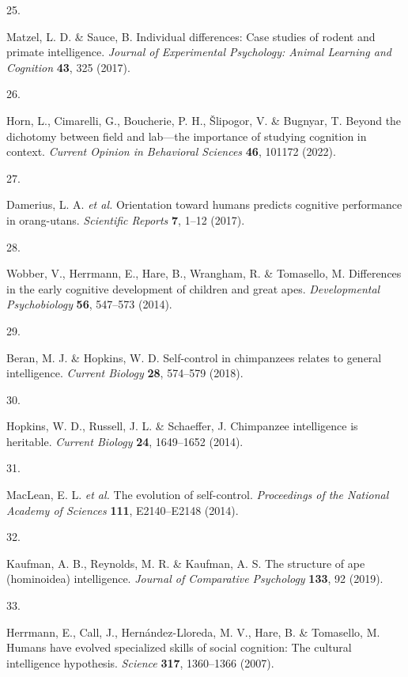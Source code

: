 \documentclass[
  man,floatsintext]{apa6}
\newlength{\cslhangindent}
\newlength{\csllabelwidth}
\newlength{\cslentryspacingunit} %
\newenvironment{CSLReferences}[2] %
 {%
  \setlength{\parindent}{0pt}
  \ifodd #1
  \let\oldpar\par
  \def\par{\hangindent=\cslhangindent\oldpar}
  \fi
  \setlength{\parskip}{#2\cslentryspacingunit}
 }%
 {}
\newcommand{\CSLLeftMargin}[1]{\parbox[t]{\csllabelwidth}{#1}}
\newcommand{\CSLRightInline}[1]{\parbox[t]{\linewidth - \csllabelwidth}{#1}\break}
\begin{document}
\begin{CSLReferences}{0}{0}
\leavevmode{}%
\CSLLeftMargin{25. }%
\CSLRightInline{Matzel, L. D. \& Sauce, B. Individual differences: Case studies of rodent and primate intelligence. \emph{Journal of Experimental Psychology: Animal Learning and Cognition} \textbf{43}, 325 (2017).}

\leavevmode{}%
\CSLLeftMargin{26. }%
\CSLRightInline{Horn, L., Cimarelli, G., Boucherie, P. H., Šlipogor, V. \& Bugnyar, T. Beyond the dichotomy between field and lab---the importance of studying cognition in context. \emph{Current Opinion in Behavioral Sciences} \textbf{46}, 101172 (2022).}

\leavevmode{}%
\CSLLeftMargin{27. }%
\CSLRightInline{Damerius, L. A. \emph{et al.} Orientation toward humans predicts cognitive performance in orang-utans. \emph{Scientific Reports} \textbf{7}, 1--12 (2017).}

\leavevmode{}%
\CSLLeftMargin{28. }%
\CSLRightInline{Wobber, V., Herrmann, E., Hare, B., Wrangham, R. \& Tomasello, M. Differences in the early cognitive development of children and great apes. \emph{Developmental Psychobiology} \textbf{56}, 547--573 (2014).}

\leavevmode{}%
\CSLLeftMargin{29. }%
\CSLRightInline{Beran, M. J. \& Hopkins, W. D. Self-control in chimpanzees relates to general intelligence. \emph{Current Biology} \textbf{28}, 574--579 (2018).}

\leavevmode{}%
\CSLLeftMargin{30. }%
\CSLRightInline{Hopkins, W. D., Russell, J. L. \& Schaeffer, J. Chimpanzee intelligence is heritable. \emph{Current Biology} \textbf{24}, 1649--1652 (2014).}

\leavevmode{}%
\CSLLeftMargin{31. }%
\CSLRightInline{MacLean, E. L. \emph{et al.} The evolution of self-control. \emph{Proceedings of the National Academy of Sciences} \textbf{111}, E2140--E2148 (2014).}

\leavevmode{}%
\CSLLeftMargin{32. }%
\CSLRightInline{Kaufman, A. B., Reynolds, M. R. \& Kaufman, A. S. The structure of ape (hominoidea) intelligence. \emph{Journal of Comparative Psychology} \textbf{133}, 92 (2019).}

\leavevmode{}%
\CSLLeftMargin{33. }%
\CSLRightInline{Herrmann, E., Call, J., Hernández-Lloreda, M. V., Hare, B. \& Tomasello, M. Humans have evolved specialized skills of social cognition: The cultural intelligence hypothesis. \emph{Science} \textbf{317}, 1360--1366 (2007).}


\end{CSLReferences}
\end{document}
